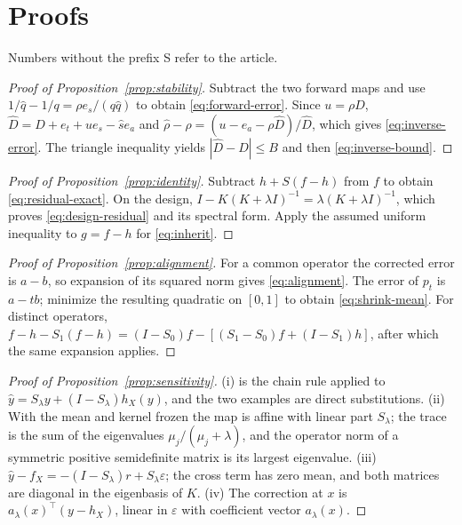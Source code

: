 \section{Proofs}\label{app:proofs}

Numbers without the prefix S refer to the article.

\begin{proof}[Proof of Proposition~\ref{prop:stability}]
Subtract the two forward maps and use
$1/\widehat q-1/q=\rho e_s/(q\widehat q)$ to obtain
\eqref{eq:forward-error}. Since $u=\rho D$,
$\widehat D=D+e_t+u e_s-\widehat s e_a$ and
$\widehat\rho-\rho=(u-e_a-\rho\widehat D)/\widehat D$, which gives
\eqref{eq:inverse-error}. The triangle inequality yields
$|\widehat D-D|\le B$ and then \eqref{eq:inverse-bound}.
\end{proof}

\begin{proof}[Proof of Proposition~\ref{prop:identity}]
Subtract $h+S(f-h)$ from $f$ to obtain \eqref{eq:residual-exact}. On the design,
$I-K(K+\lambda I)^{-1}=\lambda(K+\lambda I)^{-1}$, which proves
\eqref{eq:design-residual} and its spectral form. Apply the assumed uniform inequality to
$g=f-h$ for \eqref{eq:inherit}.
\end{proof}

\begin{proof}[Proof of Proposition~\ref{prop:alignment}]
For a common operator the corrected error is $a-b$, so expansion of its squared norm gives
\eqref{eq:alignment}. The error of $p_t$ is $a-tb$; minimize the resulting quadratic on
$[0,1]$ to obtain \eqref{eq:shrink-mean}. For distinct operators,
$f-h-S_1(f-h)=(I-S_0)f-[(S_1-S_0)f+(I-S_1)h]$, after which the same expansion applies.
\end{proof}

\begin{proof}[Proof of Proposition~\ref{prop:sensitivity}]
(i) is the chain rule applied to $\widehat y=S_\lambda y+(I-S_\lambda)h_X(y)$, and the two examples are direct
substitutions. (ii) With the mean and kernel frozen the map is affine with linear part $S_\lambda$; the trace is the
sum of the eigenvalues $\mu_j/(\mu_j+\lambda)$, and the operator norm of a symmetric positive semidefinite matrix is
its largest eigenvalue. (iii) $\widehat y-f_X=-(I-S_\lambda)r+S_\lambda\varepsilon$; the cross term has zero mean,
and both matrices are diagonal in the eigenbasis of $K$. (iv) The correction at $x$ is $a_\lambda(x)^{\top}(y-h_X)$,
linear in $\varepsilon$ with coefficient vector $a_\lambda(x)$.
\end{proof}


